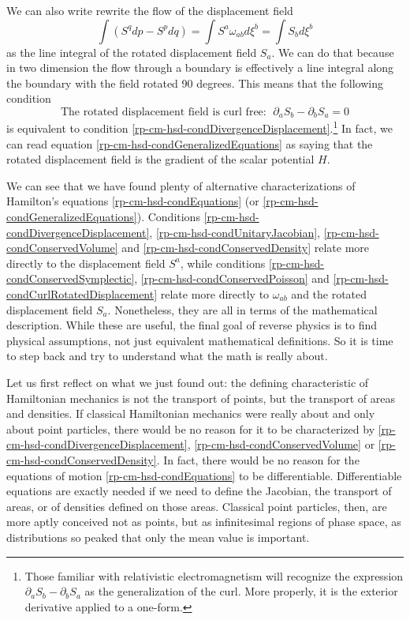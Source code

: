 We can also write rewrite the flow of the displacement field
\begin{equation}
	\int \left( S^q dp - S^p dq \right) = \int S^a \omega_{ab} d\xi^b = \int S_b d\xi^b
\end{equation}
as the line integral of the rotated displacement field $S_a$. We can do that because in two dimension the flow through a boundary is effectively a line integral along the boundary with the field rotated 90 degrees. This means that the following condition
\begin{equation}\label{rp-cm-hsd-condCurlRotatedDisplacement}
	\tag{HM-8}
	\text{The rotated displacement field is curl free: } \; \partial_a S_b - \partial_b S_a = 0
\end{equation}
is equivalent to condition \ref{rp-cm-hsd-condDivergenceDisplacement}.\footnote{Those familiar with relativistic electromagnetism will recognize the expression $\partial_a S_b - \partial_b S_a$ as the generalization of the curl. More properly, it is the exterior derivative applied to a one-form.} In fact, we can read equation \ref{rp-cm-hsd-condGeneralizedEquations} as saying that the rotated displacement field is the gradient of the scalar potential $H$.

We can see that we have found plenty of alternative characterizations of Hamilton's equations \ref{rp-cm-hsd-condEquations} (or \ref{rp-cm-hsd-condGeneralizedEquations}). Conditions  \ref{rp-cm-hsd-condDivergenceDisplacement}, \ref{rp-cm-hsd-condUnitaryJacobian}, \ref{rp-cm-hsd-condConservedVolume} and \ref{rp-cm-hsd-condConservedDensity} relate more directly to the displacement field $S^a$, while conditions \ref{rp-cm-hsd-condConservedSymplectic}, \ref{rp-cm-hsd-condConservedPoisson} and \ref{rp-cm-hsd-condCurlRotatedDisplacement} relate more directly to $\omega_{ab}$ and the rotated displacement field $S_a$. Nonetheless, they are all in terms of the mathematical description. While these are useful, the final goal of reverse physics is to find physical assumptions, not just equivalent mathematical definitions. So it is time to step back and try to understand what the math is really about.

Let us first reflect on what we just found out: the defining characteristic of Hamiltonian mechanics is not the transport of points, but the transport of areas and densities. If classical Hamiltonian mechanics were really about and only about point particles, there would be no reason for it to be characterized by \ref{rp-cm-hsd-condDivergenceDisplacement}, \ref{rp-cm-hsd-condConservedVolume} or \ref{rp-cm-hsd-condConservedDensity}. In fact, there would be no reason for the equations of motion \ref{rp-cm-hsd-condEquations} to be differentiable. Differentiable equations are exactly needed if we need to define the Jacobian, the transport of areas, or of densities defined on those areas. Classical point particles, then, are more aptly conceived not as points, but as infinitesimal regions of phase space, as distributions so peaked that only the mean value is important.

